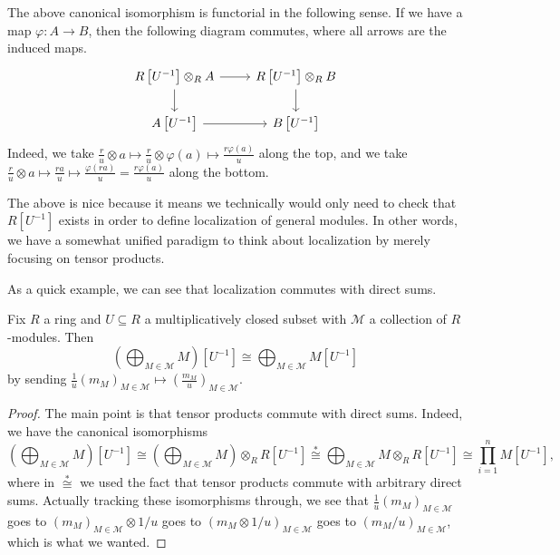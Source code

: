 \begin{remark} \label{lem:functorialiso}
	The above canonical isomorphism is functorial in the following sense. If we have a map $\varphi:A\to B$, then the following diagram commutes, where all arrows are the induced maps.
	\[\begin{tikzcd}
		{R\left[U^{-1}\right]\otimes_RA} & {R\left[U^{-1}\right]\otimes_RB} \\
		{A\left[U^{-1}\right]} & {B\left[U^{-1}\right]}
		\arrow[from=1-1, to=1-2]
		\arrow[from=2-1, to=2-2]
		\arrow[from=1-1, to=2-1]
		\arrow[from=1-2, to=2-2]
	\end{tikzcd}\]
	Indeed, we take $\frac ru\otimes a\mapsto\frac ru\otimes\varphi(a)\mapsto\frac{r\varphi(a)}u$ along the top, and we take $\frac ru\otimes a\mapsto\frac{ra}u\mapsto\frac{\varphi(ra)}u=\frac{r\varphi(a)}u$ along the bottom.
\end{remark}
The above is nice because it means we technically would only need to check that $R\left[U^{-1}\right]$ exists in order to define localization of general modules. In other words, we have a somewhat unified paradigm to think about localization by merely focusing on tensor products.

As a quick example, we can see that localization commutes with direct sums.
\begin{proposition} \label{prop:localdirectsums}
	Fix $R$ a ring and $U\subseteq R$ a multiplicatively closed subset with $\mathcal M$ a collection of $R$-modules. Then
	\[\left(\bigoplus_{M\in\mathcal M}M\right)\left[U^{-1}\right]\cong\bigoplus_{M\in\mathcal M}M\left[U^{-1}\right]\]
	by sending $\frac1u(m_M)_{M\in\mathcal M}\mapsto\left(\frac{m_M}u\right)_{M\in\mathcal M}$.
\end{proposition}
\begin{proof}
	The main point is that tensor products commute with direct sums. Indeed, we have the canonical isomorphisms
	\[\left(\bigoplus_{M\in\mathcal M}M\right)[U^{-1}]\cong\left(\bigoplus_{M\in\mathcal M}M\right)\otimes_RR[U^{-1}]\stackrel*\cong\bigoplus_{M\in\mathcal M}M\otimes_RR[U^{-1}]\cong\prod_{i=1}^nM\left[U^{-1}\right],\]
	where in $\stackrel*\cong$ we used the fact that tensor products commute with arbitrary direct sums. Actually tracking these isomorphisms through, we see that $\frac1u(m_M)_{M\in\mathcal M}$ goes to $(m_M)_{M\in\mathcal M}\otimes1/u$ goes to $(m_M\otimes1/u)_{M\in\mathcal M}$ goes to $(m_M/u)_{M\in\mathcal M}$, which is what we wanted.
\end{proof}

